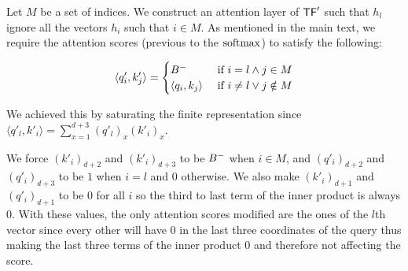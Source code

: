 Let $M$ be a set of indices.
We construct an attention layer of $\mathsf{TF}'$ such that $h_l$ ignore all the vectors $h_i$ such that $i\in M$.
As mentioned in the main text, we require the attention scores (previous to the $\mathrm{softmax}$) to satisfy the following:

\[
    \langle q_i', k_j' \rangle = \begin{cases}
        B^{-}                  & \text{ if } i = l \land j \in M \\
        \langle q_i, k_j \rangle & \text{ if } i \neq l \lor j \notin M
    \end{cases}
\]

We achieved this by saturating the finite representation since $\langle q'_l, k'_i \rangle = \sum_{x=1}^{d+3} (q'_l)_x (k'_i)_x$.

\medskip

We force $(k'_i)_{d+2}$ and $(k'_i)_{d+3}$ to be $B^{-}$ when $i \in M$, and $(q'_i)_{d+2}$ and $(q'_i)_{d+3}$ to be $1$ when $i=l$ and $0$ otherwise.
We also make $(k'_i)_{d+1}$ and $(q'_i)_{d+1}$ to be $0$ for all $i$ so the third to last term of the inner product is always $0$.
With these values, the only attention scores modified are the ones of the $l$th vector since every other will have $0$ in the last three coordinates of the query thus making the last three terms of the inner product $0$ and therefore not affecting the score.

